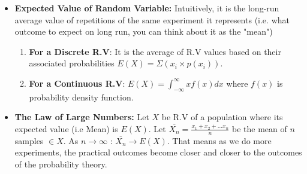\documentclass[11pt, twocolumn]{article}
\begin{document}
\begin{itemize}
\item \textbf{Expected Value of Random Variable:}
Intuitively, it is the long-run average value of repetitions of the same experiment it represents (i.e. what outcome to expect on long run, you can think about it as the "mean")
\begin{enumerate}
\item \textbf{For a Discrete R.V}: It is the average of R.V values based on their associated probabilities $E(X) = \Sigma (x_i \times p(x_i))$.
\item \textbf{For a Continuous R.V}: $E(X) = \int_{-\infty}^{\infty} x f(x) dx$ where $f(x)$ is probability density function.
\end{enumerate}
\end{itemize}


\begin{itemize}
\item \textbf{The Law of Large Numbers:}
Let $X$ be R.V of a population where its expected value (i.e Mean) is $E(X)$. Let $\overline{X_n} = \frac{x_1 + x_2 + ... x_n}{n}$ be the mean of $n$ {\color{blue}samples} $\in X$. As $n \to \infty$ : $\overline{X_n} \to E(X)$. That means as we do more experiments, the practical outcomes become {\color{blue} closer and closer} to the outcomes of the probability theory.
\end{itemize}
\end{document}
